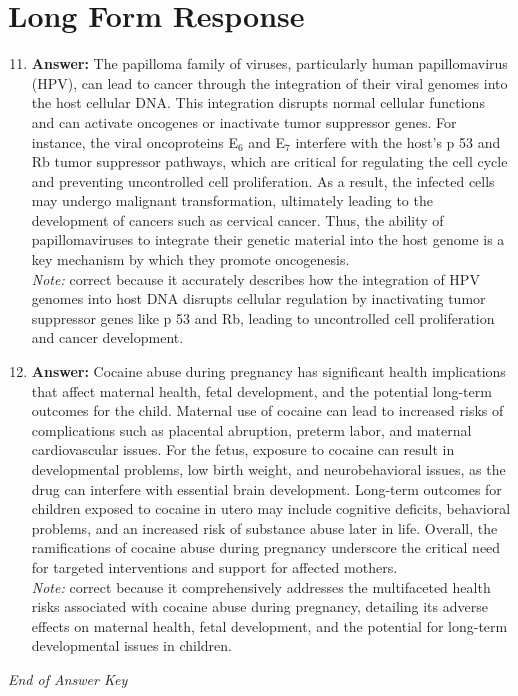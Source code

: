 \documentclass[12pt]{article}
\begin{document}
\section*{Long Form Response}
\begin{enumerate}[label=\arabic*.]
\setcounter{enumi}{10}
\item \textbf{Answer:} The papilloma family of viruses, particularly human papillomavirus (HPV), can lead to cancer through the integration of their viral genomes into the host cellular DNA. This integration disrupts normal cellular functions and can activate oncogenes or inactivate tumor suppressor genes. For instance, the viral oncoproteins E$_{6}$ and E$_{7}$ interfere with the host's p 53 and Rb tumor suppressor pathways, which are critical for regulating the cell cycle and preventing uncontrolled cell proliferation. As a result, the infected cells may undergo malignant transformation, ultimately leading to the development of cancers such as cervical cancer. Thus, the ability of papillomaviruses to integrate their genetic material into the host genome is a key mechanism by which they promote oncogenesis.
\\ \textit{Note:} correct because it accurately describes how the integration of HPV genomes into host DNA disrupts cellular regulation by inactivating tumor suppressor genes like p 53 and Rb, leading to uncontrolled cell proliferation and cancer development.
\item \textbf{Answer:} Cocaine abuse during pregnancy has significant health implications that affect maternal health, fetal development, and the potential long-term outcomes for the child. Maternal use of cocaine can lead to increased risks of complications such as placental abruption, preterm labor, and maternal cardiovascular issues. For the fetus, exposure to cocaine can result in developmental problems, low birth weight, and neurobehavioral issues, as the drug can interfere with essential brain development. Long-term outcomes for children exposed to cocaine in utero may include cognitive deficits, behavioral problems, and an increased risk of substance abuse later in life. Overall, the ramifications of cocaine abuse during pregnancy underscore the critical need for targeted interventions and support for affected mothers.
\\ \textit{Note:} correct because it comprehensively addresses the multifaceted health risks associated with cocaine abuse during pregnancy, detailing its adverse effects on maternal health, fetal development, and the potential for long-term developmental issues in children.
\end{enumerate}

\vfill
\noindent\textit{End of Answer Key}
\end{document}
